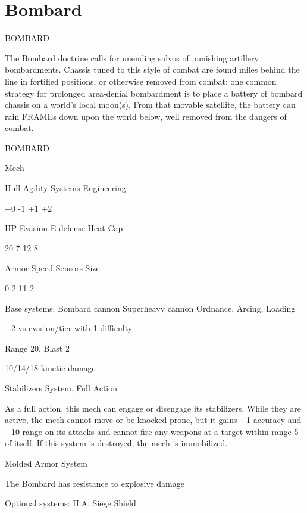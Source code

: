 \section{Bombard}

                                             BOMBARD  

The Bombard doctrine calls for unending salvos of punishing artillery bombardments. Chassis  
tuned to this style of combat are found miles behind the line in fortified positions, or otherwise  
removed from combat: one common strategy for prolonged area-denial bombardment is to place  
a battery of bombard chassis on a world’s local moon(s). From that movable satellite, the battery  
can rain FRAMEs down upon the world below, well removed from the dangers of combat. 
 

       BOMBARD 

       Mech 

       Hull      Agility     Systems       Engineering 

       +0        -1          +1            +2 

       HP        Evasion     E-defense     Heat Cap. 

       20        7            12           8 

      Armor      Speed       Sensors       Size 

       0         2            11           2 

Base systems:  
Bombard cannon  
Superheavy cannon  
Ordnance, Arcing, Loading
 
+2 vs evasion/tier with 1 difficulty
 
Range 20, Blast 2
 
10/14/18 kinetic damage
 

Stabilizers  
System, Full Action
 
As a full action, this mech can engage or disengage its stabilizers. While they are active, the  
mech cannot move or be knocked prone, but it gains +1 accuracy and +10 range on its attacks  
and cannot fire any weapons at a target within range 5 of itself. If this system is destroyed, the  
mech is immobilized.
 

Molded Armor  
System
 
The Bombard has resistance to explosive damage
 

Optional systems:  
H.A. Siege Shield  

                                                                                                       


